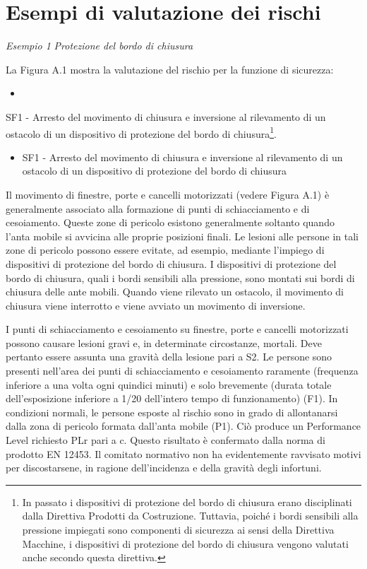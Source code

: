 \chapter{Esempi di valutazione dei rischi}
\label{app:A}

\textit{Esempio 1}
\textit{Protezione del bordo di chiusura}

La Figura A.1 mostra la valutazione del rischio per la funzione di sicurezza:
\begin{itemize}
    \item 
\end{itemize}    
\item SF1 - Arresto del movimento di chiusura e inversione al rilevamento di un ostacolo di un dispositivo di protezione del bordo di chiusura\footnote{In passato i dispositivi di protezione del bordo di chiusura erano disciplinati dalla Direttiva Prodotti da Costruzione. Tuttavia, poiché i bordi sensibili alla pressione impiegati sono componenti di sicurezza ai sensi della Direttiva Macchine, i dispositivi di protezione del bordo di chiusura vengono valutati anche secondo questa direttiva.}.

\begin{itemize}
    \item SF1 - Arresto del movimento di chiusura e inversione al rilevamento di un ostacolo di un dispositivo di protezione del bordo di chiusura
\end{itemize}

Il movimento di finestre, porte e cancelli motorizzati (vedere Figura A.1) è generalmente associato alla formazione di punti di schiacciamento e di cesoiamento. Queste zone di pericolo esistono generalmente soltanto quando l'anta mobile si avvicina alle proprie posizioni finali. Le lesioni alle persone in tali zone di pericolo possono essere evitate, ad esempio, mediante l'impiego di dispositivi di protezione del bordo di chiusura. I dispositivi di protezione del bordo di chiusura, quali i bordi sensibili alla pressione, sono montati sui bordi di chiusura delle ante mobili. Quando viene rilevato un ostacolo, il movimento di chiusura viene interrotto e viene avviato un movimento di inversione.

I punti di schiacciamento e cesoiamento su finestre, porte e cancelli motorizzati possono causare lesioni gravi e, in determinate circostanze, mortali. Deve pertanto essere assunta una gravità della lesione pari a S2. Le persone sono presenti nell'area dei punti di schiacciamento e cesoiamento raramente (frequenza inferiore a una volta ogni quindici minuti) e solo brevemente (durata totale dell'esposizione inferiore a 1/20 dell'intero tempo di funzionamento) (F1). In condizioni normali, le persone esposte al rischio sono in grado di allontanarsi dalla zona di pericolo formata dall'anta mobile (P1). Ciò produce un Performance Level richiesto PLr pari a c. Questo risultato è confermato dalla norma di prodotto EN 12453. Il comitato normativo non ha evidentemente ravvisato motivi per discostarsene, in ragione dell'incidenza e della gravità degli infortuni.


